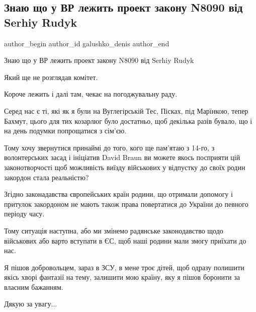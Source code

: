  
 
 
 
 

\subsection{Знаю що у ВР лежить проект закону N8090 від Serhiy Rudyk}
\label{sec:17_10_2022.fb.galushko_denis.1.znayu_shcho_u_vr_lez}

\ifcmt
 author_begin
   author_id galushko_denis
 author_end
\fi

Знаю що у ВР лежить проект закону N8090 від Serhiy Rudyk

Який ще не розглядав комітет.

Короче лежить і далі там, чекає на погоджувальну раду. 

Серед нас є ті, які як я були на Вуглегірській Тес, Пісках, під Марїнкою,
тепер Бахмут, цього для тих козарлюг було достатньо, щоб декілька разів
бувало, що і на день подумки попрощатися з сім'єю.

Тому хочу звернутися принаймі до того, кого ще пам'ятаю з 14-го, з
волонтерських засад і ініціатив David Braun ви можете якось посприяти цій
законотворчості щоб можливість виїзду військових у відпустку до своїх родин
закордон стала реальністю? 

Згідно законадавства європейських країн родини, що отримали допомогу і
притулок закордоном не мають також права повертатися до України до певного
періоду часу. 

Тому ситуація наступна, або ми змінемо радянське законодавство щодо
військових або варто вступати в ЄС, щоб наші родини мали змогу приїхати до
нас. 

Я пішов добровольцем, зараз в ЗСУ, в мене троє дітей, щоб одразу полишити
якісь хворі фантазії на тему, залишити мою країну, яку я пішов боронити за
власним бажанням. 

Дякую за увагу...

